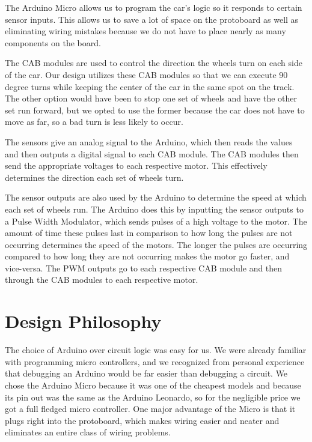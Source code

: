 \documentclass[12pt]{article}
\begin{document}
The Arduino Micro allows us to program the car's logic so it responds to certain sensor inputs. This allows us to save a lot of space on the protoboard as well as eliminating wiring mistakes because we do not have to place nearly as many components on the board.

The CAB modules are used to control the direction the wheels turn on each side of the car. Our design utilizes these CAB modules so that we can execute 90 degree turns while keeping the center of the car in the same spot on the track. The other option would have been to stop one set of wheels and have the other set run forward, but we opted to use the former because the car does not have to move as far, so a bad turn is less likely to occur. 

The sensors give an analog signal to the Arduino, which then reads the values and then outputs a digital signal to each CAB module. The CAB modules then send the appropriate voltages to each respective motor. This effectively determines the direction each set of wheels turn. 

The sensor outputs are also used by the Arduino to determine the speed at which each set of wheels run. The Arduino does this by inputting the sensor outputs to a Pulse Width Modulator, which sends pulses of a high voltage to the motor. The amount of time these pulses last in comparison to how long the pulses are not occurring determines the speed of the motors. The longer the pulses are occurring compared to how long they are not occurring makes the motor go faster, and vice-versa. The PWM outputs go to each respective CAB module and then through the CAB modules to each respective motor. 

\section{Design Philosophy}
The choice of Arduino over circuit logic was easy for us. We were already
familiar with programming micro controllers, and we recognized from personal
experience that debugging an Arduino would be far easier than debugging a
circuit. We chose the Arduino Micro because it was one of the cheapest models
and because its pin out was the same as the Arduino Leonardo, so for the
negligible price we got a full fledged micro controller. One major advantage of
the Micro is that it plugs right into the protoboard, which makes wiring easier
and neater and eliminates an entire class of wiring problems.
\end{document}
